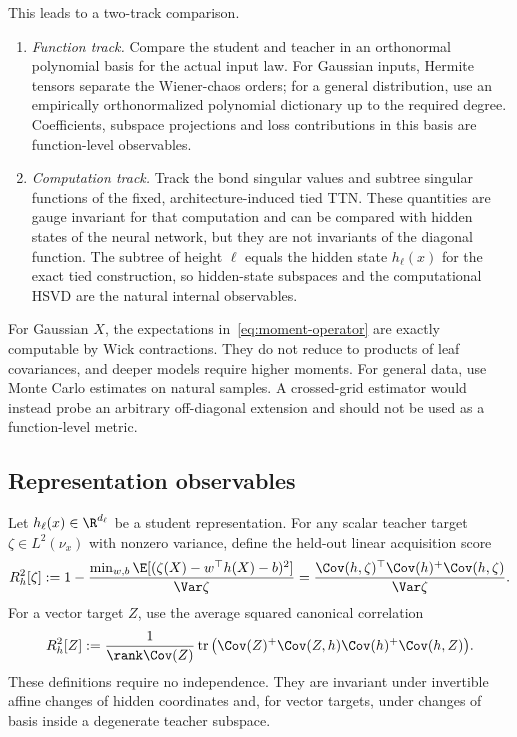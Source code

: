This leads to a two-track comparison.
\begin{enumerate}[label=(\roman*),nosep]
\item \emph{Function track.}  Compare the student and teacher in an orthonormal polynomial basis
      for the actual input law.  For Gaussian inputs, Hermite tensors separate the Wiener-chaos
      orders; for a general distribution, use an empirically orthonormalized polynomial dictionary
      up to the required degree.  Coefficients, subspace projections and loss contributions in this
      basis are function-level observables.
\item \emph{Computation track.}  Track the bond singular values and subtree singular functions of
      the fixed, architecture-induced tied TTN.  These quantities are gauge invariant for that
      computation and can be compared with hidden states of the neural network, but they are not
      invariants of the diagonal function.  The subtree of height $\ell$ equals the hidden state
      $h_\ell(x)$ for the exact tied construction, so hidden-state subspaces and the computational
      HSVD are the natural internal observables.
\end{enumerate}
For Gaussian $X$, the expectations in~\eqref{eq:moment-operator} are exactly computable by Wick
contractions.  They do not reduce to products of leaf covariances, and deeper models require higher
moments.  For general data, use Monte Carlo estimates on natural samples.  A crossed-grid estimator
would instead probe an arbitrary off-diagonal extension and should not be used as a function-level
metric.

\subsection{Representation observables}\label{sec:representation}

Let $h_\ell(x)\in\R^{d_\ell}$ be a student representation.  For any scalar teacher target
$\zeta\in L^2(\nu_x)$ with nonzero variance, define the held-out linear acquisition score
\begin{equation}\label{eq:probe}
 R_h^2[\zeta]
 :=1-\frac{\min_{w,b}\E[(\zeta(X)-w^\top h(X)-b)^2]}{\Var\zeta}
 =\frac{\Cov(h,\zeta)^\top\Cov(h)^+\Cov(h,\zeta)}{\Var\zeta}.
\end{equation}
For a vector target $Z$, use the average squared canonical correlation
\begin{equation}\label{eq:vector-probe}
 R_h^2[Z]
 :=\frac1{\rank\Cov(Z)}\operatorname{tr}
 \big(\Cov(Z)^+\Cov(Z,h)\Cov(h)^+\Cov(h,Z)\big).
\end{equation}
These definitions require no independence.  They are invariant under invertible affine changes of
hidden coordinates and, for vector targets, under changes of basis inside a degenerate teacher
subspace.

